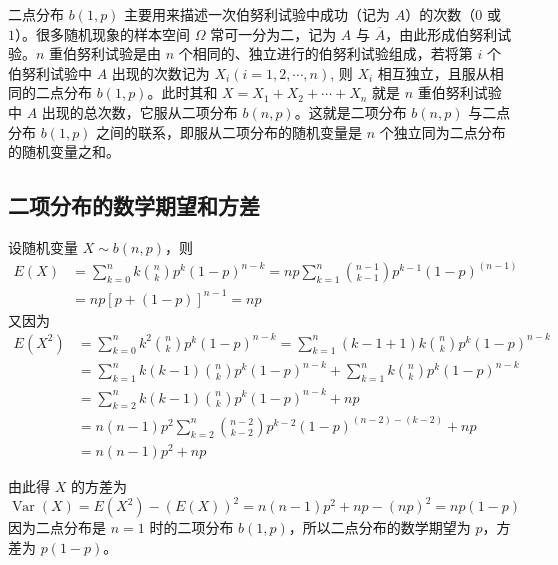 二点分布 $b(1 ,p) $ 主要用来描述一次伯努利试验中成功（记为 $A$）的次数（$0$ 或 $1$）。很多随机现象的样本空间 $\Omega$ 常可一分为二，记为 $A $ 与 $\overline A$，由此形成伯努利试验。$n $ 重伯努利试验是由 $n $ 个相同的、独立进行的伯努利试验组成，若将第 $i $ 个伯努利试验中 $A $ 出现的次数记为 $X_i (i= 1,2, \cdots, n)$, 则 $X_i$ 相互独立，且服从相同的二点分布 $b(1 ,p)$。此时其和 $X=X_1+X_2+\cdots+X_n$ 就是 $n $ 重伯努利试验中 $A $ 出现的总次数，它服从二项分布 $b(n,p)$。这就是二项分布 $b (n ,p) $ 与二点分布 $b(1,p)$ 之间的联系，即服从二项分布的随机变量是 $n$ 个独立同为二点分布的随机变量之和。

\subsection{二项分布的数学期望和方差}

设随机变量 $X\sim b(n,p)$，则
\begin{equation}
\begin{aligned} E(X) &=\sum_{k=0}^{n} k\binom{n}{k} p^{k}(1-p)^{n-k}=n p \sum_{k=1}^{n}\binom{n-1}{k-1} p^{k-1}(1-p)^{(n-1)} \\ &=n p[p+(1-p)]^{n-1}=n p \end{aligned}
\end{equation}
又因为
\begin{equation}
\begin{aligned} E\left(X^{2}\right) &=\sum_{k=0}^{n} k^{2}\binom{n}{k} p^{k}(1-p)^{n-k}=\sum_{k=1}^{n}(k-1+1) k\binom{n}{k} p^{k}(1-p)^{n-k} \\ &=\sum_{k=1}^{n} k(k-1)\binom{n}{k} p^{k}(1-p)^{n-k}+\sum_{k=1}^{n} k\binom{n}{k} p^{k}(1-p)^{n-k} \\ &=\sum_{k=2}^{n} k(k-1)\binom{n}{k} p^{k}(1-p)^{n-k}+n p \\ &=n(n-1) p^{2} \sum_{k=2}^{n}\binom{n-2}{k-2} p^{k-2}(1-p)^{(n-2)-(k-2)}+n p \\ &=n(n-1) p^{2}+n p \end{aligned}
\end{equation}

由此得 $X $ 的方差为
\begin{equation}
\operatorname{Var}(X)=E\left(X^{2}\right)-(E(X))^{2}=n(n-1) p^{2}+n p-(n p)^{2}=n p(1-p)
\end{equation}
因为二点分布是 $n=1$ 时的二项分布 $b(1,p)$，所以二点分布的数学期望为 $p$，方差为 $p(1-p)$。

